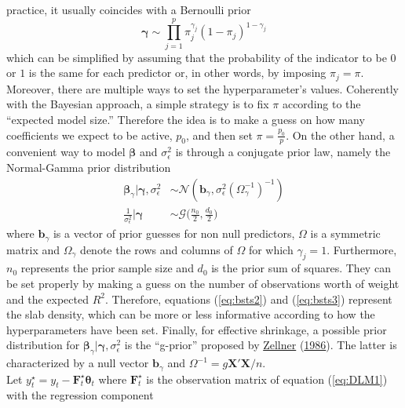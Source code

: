 \documentclass[
  12pt,
]{book}
\theoremstyle{break}
\theoremstyle{nonumberplain}
\begin{document}
practice, it usually coincides with a Bernoulli prior \begin{equation*}
\boldsymbol{\gamma }\sim \prod_{j=1}^{p}\pi_{j}^{\gamma_{j}}(1-\pi_{j})^{1-\gamma_{j}}
\end{equation*} which can be simplified by assuming that the probability
of the indicator to be \(0\) or \(1\) is the same for each predictor or,
in other words, by imposing \(\pi_{j}=\pi\). Moreover, there are
multiple ways to set the hyperparameter's values. Coherently with the
Bayesian approach, a simple strategy is to fix \(\pi\) according to the
``expected model size.'' Therefore the idea is to make a guess on how
many coefficients we expect to be active, \(p_{0}\), and then set
\(\pi=\frac{p_{0}}{p}\). On the other hand, a convenient way to model
\(\boldsymbol{\beta}\) and \(\sigma^{2}_{\epsilon}\) is through a
conjugate prior law, namely the Normal-Gamma prior distribution
\begin{align} \label{eq:bsts2}
\boldsymbol{\beta}_{\gamma}|\boldsymbol{\gamma},\sigma^{2}_{\epsilon} & \sim \mathcal{N}(\boldsymbol{b}_{\gamma},\sigma^{2}_{\epsilon}(\Omega_{\gamma}^{-1})^{-1}) \\
\frac{1}{\sigma_{\epsilon}^{2}}|\boldsymbol{\gamma }& \sim \mathcal{G}\bigg(\frac{n_{0}}{2},\frac{d_{0}}{2}\bigg)  \label{eq:bsts3}
\end{align} where \(\boldsymbol{b}_{\gamma}\) is a vector of prior
guesses for non null predictors, \(\Omega\) is a symmetric matrix and
\(\Omega_{\gamma}\) denote the rows and columns of \(\Omega\) for which
\(\gamma_{j}=1\). Furthermore, \(n_{0}\) represents the prior sample
size and \(d_{0}\) is the prior sum of squares. They can be set properly
by making a guess on the number of observations worth of weight and the
expected \(R^{2}\). Therefore, equations (\ref{eq:bsts2}) and
(\ref{eq:bsts3}) represent the slab density, which can be more or less
informative according to how the hyperparameters have been set. Finally,
for effective shrinkage, a possible prior distribution for
\(\boldsymbol{\beta}_{\gamma}|\boldsymbol{\gamma},\sigma^{2}_{\epsilon}\)
is the ``g-prior'' proposed by
\protect\hyperlink{ref-zellner_1986}{Zellner}
(\protect\hyperlink{ref-zellner_1986}{1986}). The latter is
characterized by a null vector \(\boldsymbol{b}_{\gamma}\) and
\(\Omega^{-1}=g\boldsymbol{X}'\boldsymbol{X}/n\).\\
Let
\(y^{\star}_{t}=y_{t}-\boldsymbol{F}_{t}^{\star}\boldsymbol{\theta}_{t}\)
where \(\boldsymbol{F}_{t}^{\star}\) is the observation matrix of
equation (\ref{eq:DLM1}) with the regression component
\end{document}
